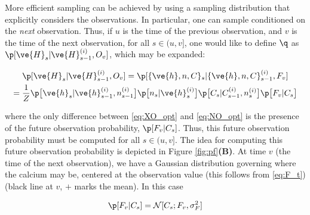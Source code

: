 %

More efficient sampling can be achieved by using a sampling distribution that explicitly considers the observations.  In particular, one can sample conditioned on the \emph{next} observation.  Thus, if $u$ is the time of the previous observation, and $v$ is the time of the next observation, for all $s \in(u,v]$, one would like to define $\q$ as $\p[\ve{H}_s|\ve{H}_{s-1}^{(i)},O_v]$, which may be expanded:

\begin{multline} \label{eq:XO_opt}
\p[\ve{H}_s|\ve{H}_{s-1}^{(i)},O_v] = \p [\{\ve{h},n,C\}_s | \{\ve{h},n,C\}_{s-1}^{(i)}, F_v]
\\ = \frac{1}{Z} \p \big[ \ve{h}_s | \ve{h}^{(i)}_{s-1}, n_{s-1}^{(i)} \big] \p \big[ n_s | \ve{h}^{(i)}_{s} \big] \p \big[ C_s | C^{(i)}_{s-1}, n_s^{(i)} \big] \p \big[ F_v | C_s \big]
\end{multline}

\noindent where the only difference between \eqref{eq:XO_opt} and \eqref{eq:NO_opt} is the presence of the future observation probability,  $\p[F_v | C_s]$.  Thus, this future observation probability must be computed for all $s \in(u,v]$.  The idea for computing this future observation probability is depicted in Figure \ref{fig:pf}\textbf{(B)}.  At time $v$ (the time of the next observation), we have a Gaussian distribution governing where the calcium may be, centered at the observation value (this follows from \eqref{eq:F_t}) (black line at $v$, $+$ marks the mean). In this case

\begin{align}
\p[F_v | C_s] = \mathcal{N}[C_s; F_v, \sigma_F^2]
\end{align}

